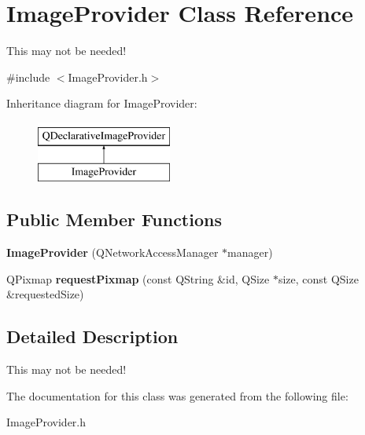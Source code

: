 \hypertarget{classImageProvider}{\section{Image\-Provider Class Reference}
\label{classImageProvider}
}


This may not be needed!  




{\ttfamily \#include $<$Image\-Provider.\-h$>$}

Inheritance diagram for Image\-Provider\-:\begin{figure}[H]
\begin{center}
\leavevmode
\includegraphics[height=2.000000cm]{classImageProvider}
\end{center}
\end{figure}
\subsection*{Public Member Functions}
\begin{DoxyCompactItemize}
\item 
\hypertarget{classImageProvider_ae46729dae339dc520ac3c7ee9e6a57f3}{{\bfseries Image\-Provider} (Q\-Network\-Access\-Manager $\ast$manager)}\label{classImageProvider_ae46729dae339dc520ac3c7ee9e6a57f3}

\item 
\hypertarget{classImageProvider_af5bad351240a627040ebadf5c181d102}{Q\-Pixmap {\bfseries request\-Pixmap} (const Q\-String \&id, Q\-Size $\ast$size, const Q\-Size \&requested\-Size)}\label{classImageProvider_af5bad351240a627040ebadf5c181d102}

\end{DoxyCompactItemize}


\subsection{Detailed Description}
This may not be needed! 

The documentation for this class was generated from the following file\-:\begin{DoxyCompactItemize}
\item 
Image\-Provider.\-h\end{DoxyCompactItemize}
